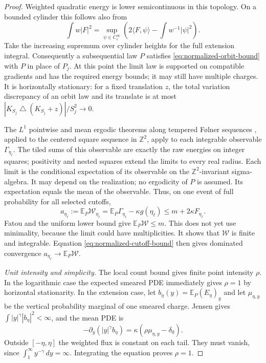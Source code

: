 \begin{proof}
Weighted quadratic energy is lower semicontinuous in this topology.
On a bounded cylinder this follows also from
\[
 \int w|F|^2
 =\sup_{\psi\in C_c^\infty}
       \left(2\langle F,\psi\rangle-\int w^{-1}|\psi|^2\right).
\]
Take the increasing supremum over cylinder heights for the full
extension integral.  Consequently a subsequential law $P$ satisfies
\eqref{eq:normalized-orbit-bound} with $P$ in place of $P_j$.
At this point the limit law is supported on compatible gradients and has
the required energy bounds; it may still have multiple charges.
It is horizontally stationary: for a fixed translation $z$, the
total variation discrepancy of an orbit law and its translate is at
most $|K_{S_j}\mathbin\triangle(K_{S_j}+z)|/S_j^2\to0$.

The $L^1$ pointwise and mean ergodic theorems along tempered
F\o lner sequences \citep[Section~1]{Lindenstrauss1999}, applied to
the centered square sequence in $\mathbb Z^2$, apply to each
integrable observable $\Gamma_{\eta_\ell}$.
The tiled sums of this observable are exactly the raw energies on integer squares;
positivity and nested squares extend the limits to every real radius.
Each limit is the conditional expectation of its observable on the
$\mathbb Z^2$-invariant sigma-algebra. It may depend on the realization;
no ergodicity of $P$ is assumed. Its expectation equals the mean of the
observable. Thus, on one event of full probability for all selected cutoffs,
\[
 a_{\eta_\ell}:=\mathbb E_P\mathcal W_{\eta_\ell}
       =\mathbb E_P\Gamma_{\eta_\ell}-\kappa g(\eta_\ell)
       \le m+2\kappa F_{\eta_\ell}.
\]
Fatou and the uniform lower bound give $\mathbb E_P\mathcal W\le m$.
This does not yet use minimality, because the limit could have
multiplicities.  It shows that $\mathcal W$ is finite and integrable.
Equation \eqref{eq:normalized-cutoff-bound} then gives dominated
convergence $a_{\eta_\ell}\to\mathbb E_P\mathcal W$.

\emph{Unit intensity and simplicity.}
The local count bound gives finite point intensity $\rho$.
In the logarithmic case the expected smeared PDE immediately gives
$\rho=1$ by horizontal stationarity.  In the extension case, let
$b_\eta(y)=\mathbb E_P(E_\eta)_y$ and let $\mu_{\eta,y}$ be the
vertical probability marginal of one smeared charge.  Jensen gives
$\int |y|^\gamma|b_\eta|^2<\infty$, and the mean PDE is
\[
 -\partial_y(|y|^\gamma b_\eta)
       =\kappa(\rho\mu_{\eta,y}-\delta_0).
\]
Outside $[-\eta,\eta]$ the weighted flux is constant on each tail.
They must vanish, since $\int_1^\infty y^{-\gamma}\,dy=\infty$.
Integrating the equation proves $\rho=1$.


\end{proof}
